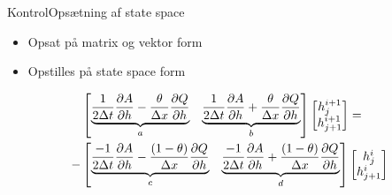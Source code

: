 \begin{frame}{Kontrol}{Opsætning af state space}
 \vfill\vfill\centering    
\begin{itemize}
	\item Opsat på matrix og vektor form \vspace{5mm}
	\item Opstilles på state space form   \vspace{5mm}
\end{itemize}
\begin{equation*}\label{eq:rearrange_continuity_eq}
\begin{aligned}
	&\begin{bmatrix}
		\underbrace{\frac{1}{2\Delta t}\frac{\partial A}{\partial h}-\frac{\theta}{\Delta x}\frac{\partial Q}{\partial h}}_{a} & \underbrace{\frac{1}{2\Delta t}\frac{\partial A}{\partial h}+\frac{\theta}{\Delta x}\frac{\partial Q}{\partial h}}_{b} 
	\end{bmatrix}
	\begin{bmatrix}
		h_{j}^{i+1} \\
		h_{j+1}^{i+1}
	\end{bmatrix}
	= \\ \vspace{5mm} -
	&\begin{bmatrix}
		\underbrace{\frac{-1}{2\Delta t}\frac{\partial A}{\partial h}-\frac{(1-\theta)}{\Delta x}\frac{\partial Q}{\partial h}}_{c} & \underbrace{\frac{-1}{2\Delta t}\frac{\partial A}{\partial h}+\frac{(1-\theta)}{\Delta x}\frac{\partial Q}{\partial h}}_{d} 
	\end{bmatrix}
	\begin{bmatrix}
		h_{j}^{i} \\
		h_{j+1}^{i}
	\end{bmatrix}
	\end{aligned}
\end{equation*}
\vfill\vfill
\end{frame}




